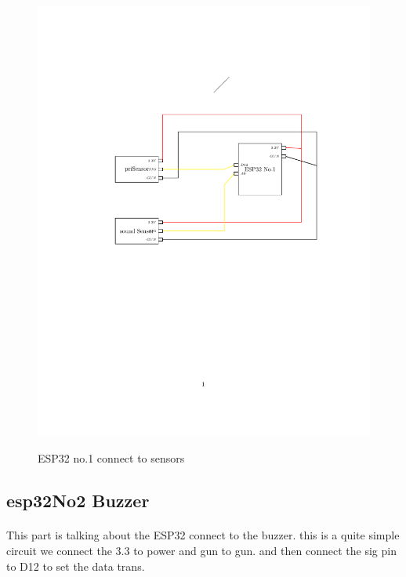 \documentclass[a4paper, 12pt]{article}        %
\begin{document}
    \begin{figure}[h]
        \caption{ESP32 no.1 connect to sensors}
        \centering
        \includegraphics[width=1\textwidth]{../out/ESP32_No1_connect_Sensor}
        \label{fig:figure2}
    \end{figure}


    \pagebreak
    \subsection{esp32No2 Buzzer}\label{subsec:esp32no2-buzzer}
    \paragraph{}
    This part is talking about the ESP32 connect to the buzzer.
    this is a quite simple circuit we connect the 3.3 to power and gun to gun.
    and then connect the sig pin to D12 to set the data trans.

    \blindtext{}
\end{document}
